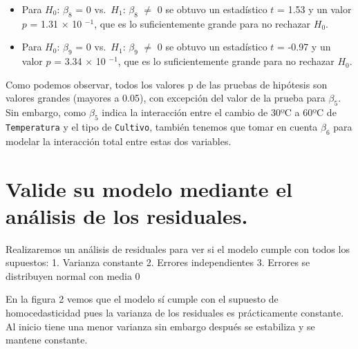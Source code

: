 \documentclass[10pt, spanish]{article}
\providecommand{\tightlist}{%
      \setlength{\itemsep}{0pt}\setlength{\parskip}{0pt}}
\begin{document}
    
    \begin{itemize}
\tightlist
\item
  Para \(H_0\): \(\beta_8\) = 0 vs.~\(H_1\): \(\beta_8\) \(\neq\) 0 se
  obtuvo un estadístico \(t\) = 1.53 y un valor \(p\) = 1.31 \(\times\)
  10 \(^{-1}\), que es lo suficientemente grande para no rechazar
  \(H_0\).
\end{itemize}

    
    \begin{itemize}
\tightlist
\item
  Para \(H_0\): \(\beta_9\) = 0 vs.~\(H_1\): \(\beta_9\) \(\neq\) 0 se
  obtuvo un estadístico \(t\) = -0.97 y un valor \(p\) = 3.34 \(\times\)
  10 \(^{-1}\), que es lo suficientemente grande para no rechazar
  \(H_0\).
\end{itemize}

    
    Como podemos observar, todos los valores p de las pruebas de hipótesis
son valores grandes (mayores a 0.05), con excepción del valor de la
prueba para \(\beta_5\). Sin embargo, como \(\beta_5\) indica la
interacción entre el cambio de 30ºC a 60ºC de \texttt{Temperatura} y el
tipo de \texttt{Cultivo}, también tenemos que tomar en cuenta
\(\beta_6\) para modelar la interacción total entre estas dos variables.

    \hypertarget{valide-su-modelo-mediante-el-anuxe1lisis-de-los-residuales.}{%
\section{Valide su modelo mediante el análisis de los
residuales.}\label{valide-su-modelo-mediante-el-anuxe1lisis-de-los-residuales.}}

    Realizaremos un análisis de residuales para ver si el modelo cumple con
todos los supuestos: 1. Varianza constante 2. Errores independientes 3.
Errores se distribuyen normal con media 0

    \begin{center}
    \end{center}
    
    
    En la figura 2 vemos que el modelo sí cumple con el supuesto de
homocedasticidad pues la varianza de los residuales es prácticamente
constante. Al inicio tiene una menor varianza sin embargo después se
estabiliza y se mantene constante.

    \begin{center}
    \end{center}
    
\end{document}
